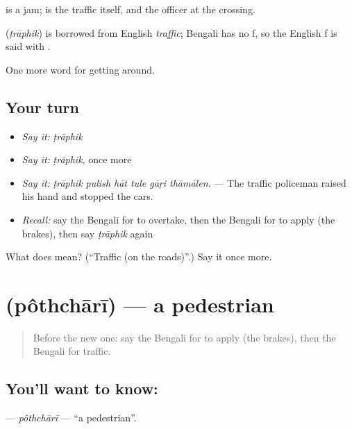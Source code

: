  is a jam;  is the traffic itself, and   the officer at the crossing.

\begin{cousinweb}
\textbf{} (\emph{ṭrāphik}) is borrowed from English \emph{traffic}; Bengali has no f, so the English f is said with .
\end{cousinweb}

\begin{grammarlens}[title={What you've built}]
One more word for getting around.
\end{grammarlens}

\subsection*{Your turn}
\begin{itemize}
\raggedright
  \item \emph{Say it:} \emph{ṭrāphik}
  \item \emph{Say it:} \emph{ṭrāphik}, once more
  \item \emph{Say it:} \emph{ṭrāphik pulish hāt tule gāṛi thāmālen.} — The traffic policeman raised his hand and stopped the cars.
  \item \emph{Recall:} say the Bengali for to overtake, then the Bengali for to apply (the brakes), then say \emph{ṭrāphik} again
\end{itemize}

\begin{tcolorbox}[breakable,colback=teal!4,colframe=teal!35!black,title={Before you move on}]
What does  mean? (\textquotedblleft{}Traffic (on the roads)\textquotedblright{}.) Say it once more.
\end{tcolorbox}
\section[\texorpdfstring{\bn{পথচারী} (pôthchārī)}{পথচারী (pôthchārī)}]{ (pôthchārī) — a pedestrian}

\label{lesson:BN-C392-pothchari}



\begin{quote}
Before the new one: say the Bengali for to apply (the brakes), then the Bengali for traffic.
\end{quote}

\subsection*{You'll want to know: }
\textbf{} — \emph{pôthchārī} — \textquotedblleft{}a pedestrian\textquotedblright{}.

